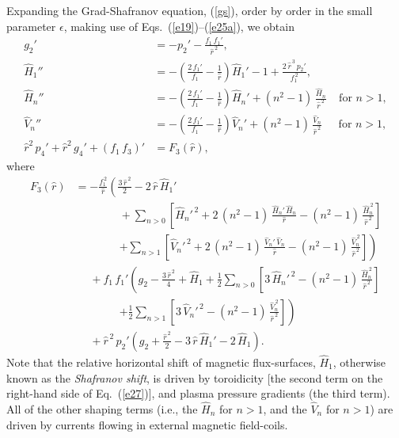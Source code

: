 \documentclass[12pt,prb,aps]{revtex4-1}
\begin{document}
 Expanding the Grad-Shafranov equation, (\ref{gs}), order by order in the
small parameter $\epsilon$, making use of Eqs.~(\ref{e19})--(\ref{e25a}), we obtain\,\cite{con0,con,greene,gim}
\begin{align}
g_2'&=- p_2' - \frac{f_1\,f_1'}{\hat{r}^{\,2}},\label{e26}\\[0.5ex]
\hat{H}_1''&= -\left(\frac{2\,f_1'}{f_1}-\frac{1}{\hat{r}}\right)\hat{H}_1' 
-1+\frac{2\,\hat{r}^{\,3}\,p_2'}{f_1^{\,2}},\label{e27}\\[0.5ex]
\hat{H}_n''&= -\left(\frac{2\,f_1'}{f_1}-\frac{1}{\hat{r}}\right)\hat{H}_n'+(n^2-1)\,\frac{\hat{H}_n}{\hat{r}^{\,2}}~~~~~\mbox{for $n>1$},\label{e33x}\\[0.5ex]
\hat{V}_n''&= -\left(\frac{2\,f_1'}{f_1}-\frac{1}{\hat{r}}\right)\hat{V}_n'+(n^2-1)\,\frac{\hat{V}_n}{\hat{r}^{\,2}}~~~~~~\,\mbox{for $n>1$},\label{e28}\\[0.5ex]
\hat{r}^2\,p_4'+\hat{r}^2\,g_4'+(f_1\,f_3)'&=F_3(\hat{r}),\label{e30}
\end{align}
where
\begin{align}
F_3(\hat{r}) &= -\frac{f_1^{\,2}}{\hat{r}}\left(
\frac{3\,\hat{r}^{\,2}}{2}-2\,\hat{r}\,\hat{H}_1'\right.\nonumber\\[0.5ex]
&\phantom{===}
+\sum_{n>0}\left[\hat{H}_n'^{\,2}+2\,(n^2-1)\,\frac{\hat{H}_n'\,\hat{H}_n}{\hat{r}}-(n^2-1)\,\frac{\hat{H}_n^{\,2}}{\hat{r}^{\,2}}\right]\nonumber\\[0.5ex]
&\phantom{===}\left.+\sum_{n>1}\left[\hat{V}_n'^{\,2}+2\,(n^2-1)\,\frac{\hat{V}_n'\,\hat{V}_n}{\hat{r}}-(n^2-1)\,\frac{\hat{V}_n^{\,2}}{\hat{r}^{\,2}}\right]\right)\nonumber\\[0.5ex]
&\phantom{=}
+f_1\,f_1'\left(g_2-\frac{3\,\hat{r}^{\,2}}{4} +\hat{H}_1 +\frac{1}{2}\sum_{n>0}\left[3\,\hat{H}_n'^{\,2}- (n^2-1)\,\frac{\hat{H}_n^{\,2}}{\hat{r}^{\,2}}\right]
\right.\nonumber\\[0.5ex]
&\phantom{===}\left.+\frac{1}{2}\sum_{n>1}\left[3\,\hat{V}_n'^{\,2}- (n^2-1)\,\frac{\hat{V}_n^{\,2}}{\hat{r}^{\,2}}\right]\right)\nonumber\\[0.5ex]
&\phantom{=}
+\hat{r}^{\,2}\,p_2'\left(g_2+\frac{\hat{r}^{\,2}}{2}-3\,\hat{r}\,\hat{H}_1'-2\,\hat{H}_1\right).\label{e31}
\end{align}
Note that the relative horizontal shift of magnetic flux-surfaces, $\hat{H}_1$, otherwise known as the {\em Shafranov shift},\cite{shaf} is driven by toroidicity [the second term on
the right-hand side of Eq.~(\ref{e27})], and plasma pressure gradients (the third term). All of the other shaping terms (i.e., the $\hat{H}_n$ for $n>1$, and
the $\hat{V}_n$ for $n>1$) are driven by currents flowing in external magnetic field-coils. 
\end{document}
